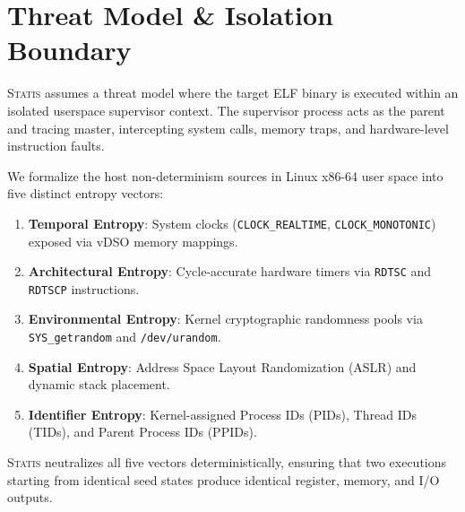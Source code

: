\documentclass[twocolumn,10pt,sigconf,nonacm]{acmart}
\begin{document}
\section{Threat Model \& Isolation Boundary}

\textsc{Statis} assumes a threat model where the target ELF binary is executed within an isolated userspace supervisor context. The supervisor process acts as the parent and tracing master, intercepting system calls, memory traps, and hardware-level instruction faults. 

We formalize the host non-determinism sources in Linux x86-64 user space into five distinct entropy vectors:
\begin{enumerate}
    \item \textbf{Temporal Entropy}: System clocks (\texttt{CLOCK\_REALTIME}, \texttt{CLOCK\_MONOTONIC}) exposed via vDSO memory mappings.
    \item \textbf{Architectural Entropy}: Cycle-accurate hardware timers via \texttt{RDTSC} and \texttt{RDTSCP} instructions.
    \item \textbf{Environmental Entropy}: Kernel cryptographic randomness pools via \texttt{SYS\_getrandom} and \texttt{/dev/urandom}.
    \item \textbf{Spatial Entropy}: Address Space Layout Randomization (ASLR) and dynamic stack placement.
    \item \textbf{Identifier Entropy}: Kernel-assigned Process IDs (PIDs), Thread IDs (TIDs), and Parent Process IDs (PPIDs).
\end{enumerate}

\textsc{Statis} neutralizes all five vectors deterministically, ensuring that two executions starting from identical seed states produce identical register, memory, and I/O outputs.
\end{document}
